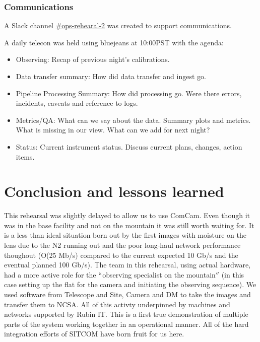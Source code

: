 \subsubsection{Communications }


A Slack channel \href{https://lsstc.slack.com/messages/CJBSY6FUN}{\#ops-rehearal-2} was created to support communications.

A daily telecon was held using bluejeans at 10:00PST with the agenda:
\begin{itemize}
\item Observing: Recap of previous night's calibrations.
\item Data transfer summary:  How did data transfer and ingest go.
\item Pipeline Processing Summary: 	How did processing go.  Were there errors, incidents, caveats and reference to logs.
\item Metrics/QA:  What can we say about the data. Summary plots and metrics.  What is missing in our view. What can we add for next night?
\item Status:   Current instrument status.  Discuss current plans, changes, action items.

\end{itemize}







\section{Conclusion and lessons learned}\label{sec:conc}
This rehearsal was slightly delayed to allow us to use ComCam. Even though it was in the base facility and not on 
the mountain it was still worth waiting for.
It is a less than ideal situation born out by the first images with moisture on the lens due to the N2 running out
and the poor long-haul network performance thoughout (O(25 Mb/s) compared to the current expected 10 Gb/s and the
eventual planned 100 Gb/s).
The team in this rehearsal, using actual hardware, had a more active role for the $``$observing specialist on the mountain$''$ (in this case setting up the flat for the camera and initiating the observing sequence).
We used software from Telescope and Site, Camera and DM to take the images and transfer them to NCSA.
All of this activty underpinned by machines and networks supported by Rubin IT.
This is a first true demonstration of multiple parts of the system working together in an operational manner.
All of the hard integration efforts of SITCOM have born fruit for us here.


